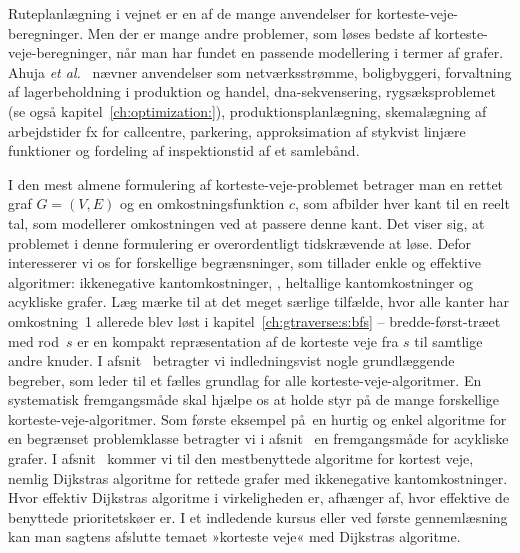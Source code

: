Ruteplanlægning
i vejnet er en af de mange anvendelser for korteste-veje-beregninger.
Men der er mange andre problemer, som løses bedste af korteste-veje-beregninger, når man har fundet en passende modellering i termer af grafer.
Ahuja \emph{et al.}~\cite{AhuMagOrl93} nævner anvendelser som netværksstrømme, boligbyggeri, forvaltning af lagerbeholdning i produktion og handel, 
dna-sekvensering, rygsæksproblemet 
(se også kapitel~\ref{ch:optimization:}), produktionsplanlægning, skemalægning af arbejdstider fx for callcentre,
parkering, approksimation af stykvist linjære funktioner og fordeling af inspektionstid af et samlebånd.

I den mest almene formulering af korteste-veje-problemet betrager man en rettet graf $G=(V,E)$ og en omkostningsfunktion $c$, som afbilder hver kant til en reelt tal, som modellerer omkostningen ved at passere denne kant. 
Det viser sig, at problemet i denne formulering er overordentligt tidskrævende at løse.
Defor interesserer vi os for forskellige begrænsninger, som tillader enkle og effektive algoritmer: 
ikkenegative kantomkostninger,
, 
heltallige kantomkostninger
og acykliske grafer.
Læg mærke til at det meget særlige tilfælde, hvor alle kanter har omkostning~1
allerede blev løst i kapitel~\ref{ch:gtraverse:s:bfs} -- bredde-først-træet med rod~$s$  er en kompakt repræsentation af de korteste veje fra $s$ til samtlige andre knuder. 
I afsnit~ betragter vi indledningsvist nogle grundlæggende begreber, som leder til et fælles grundlag for alle korteste-veje-algoritmer. 
En systematisk fremgangsmåde skal hjælpe os at holde styr på de mange forskellige korteste-veje-algoritmer.
Som første eksempel på en hurtig og enkel algoritme for en begrænset problemklasse betragter vi i afsnit~ en fremgangsmåde for acykliske grafer.
I afsnit~ kommer vi til den mestbenyttede algoritme for kortest veje, nemlig Dijkstras algoritme for rettede grafer med ikkenegative kantomkostninger.
Hvor effektiv Dijkstras algoritme i virkeligheden er, afhænger af, hvor effektive de benyttede prioritetskøer er.
I et indledende kursus eller ved første gennemlæsning kan man sagtens afslutte temaet »korteste veje« med Dijkstras algoritme.
